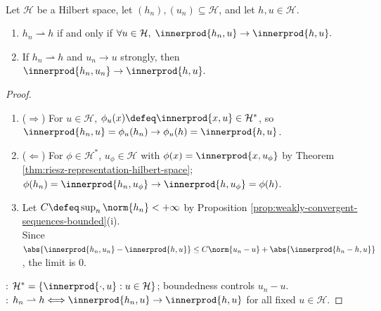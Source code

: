 \begin{proposition} \label{prop:hilbert-weak-convergence-inner-product-tests} \\
Let $\mathcal{H}$ be a Hilbert space, let $(h_n),(u_n)\subseteq\mathcal{H}$, and let $h,u\in\mathcal{H}$.
\begin{enumerate}[label=(\roman*)]
\setlength{\itemsep}{0pt}
\item $h_n\rightharpoonup h$ if and only if
$\forall u\in\mathcal{H},\; \innerprod{h_n,u}\to\innerprod{h,u}.$
\item If $h_n\rightharpoonup h$ and $u_n\to u$ strongly, then
$\innerprod{h_n,u_n}\to\innerprod{h,u}.$
\end{enumerate}
\begin{proof}
\begin{enumerate}[label=(\roman*)]
\setlength{\itemsep}{0pt}
\item[$(i)$] ($\Rightarrow$) For $u\in\mathcal{H}$, $\phi_u(x)\defeq\innerprod{x,u}\in\mathcal{H}^*$, so $\innerprod{h_n,u}=\phi_u(h_n)\to\phi_u(h)=\innerprod{h,u}$.
\item[$(i)$] ($\Leftarrow$) For $\phi\in\mathcal{H}^*$, $u_\phi\in\mathcal{H}$ with $\phi(x)=\innerprod{x,u_\phi}$ by Theorem \ref{thm:riesz-representation-hilbert-space}; $\phi(h_n)=\innerprod{h_n,u_\phi}\to\innerprod{h,u_\phi}=\phi(h)$.
\item[$(ii)$] Let $C\defeq\sup_n\norm{h_n}<+\infty$ by Proposition \ref{prop:weakly-convergent-sequences-bounded}(i).\\
Since $\abs{\innerprod{h_n,u_n}-\innerprod{h,u}}\leq C\norm{u_n-u}+\abs{\innerprod{h_n-h,u}}$, the limit is $0$.
\end{enumerate}
: $\mathcal H^*=\{\innerprod{\cdot,u}:u\in\mathcal H\}$; boundedness controls $u_n-u$.\\
: $h_n\rightharpoonup h\Longleftrightarrow\innerprod{h_n,u}\to\innerprod{h,u}$ for all fixed $u\in\mathcal H$.
\end{proof}
\end{proposition}

